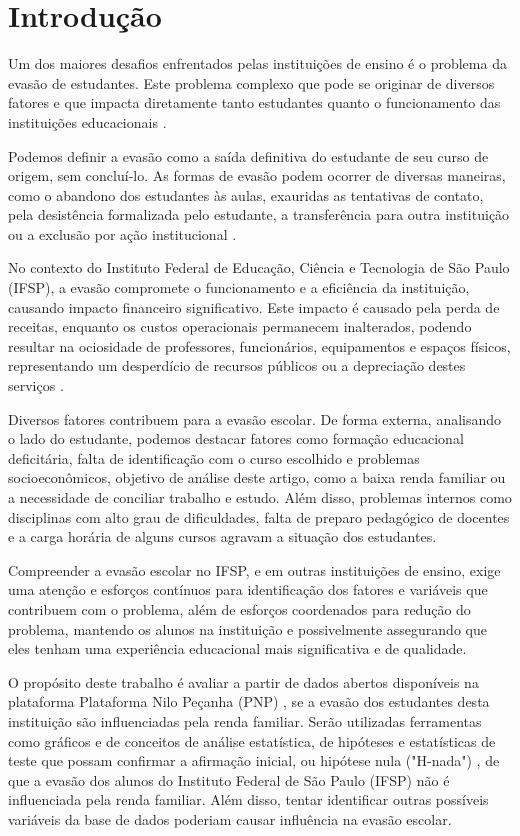 \documentclass[conference]{IEEEtran}
\begin{document}
\section{Introdução}
Um dos maiores desafios enfrentados pelas instituições de ensino é o problema da evasão de estudantes. Este problema complexo que pode se originar de diversos fatores e que impacta diretamente tanto estudantes quanto o funcionamento das instituições educacionais \cite{oliveira2021}.\par
Podemos definir a evasão como a saída definitiva do estudante de seu curso de origem, sem concluí-lo. As formas de evasão podem ocorrer de diversas maneiras, como o abandono dos estudantes às aulas, exauridas as tentativas de contato, pela desistência formalizada pelo estudante, a transferência para outra instituição ou a exclusão por ação institucional \cite{silveira2021}.\par
No contexto do Instituto Federal de Educação, Ciência e Tecnologia de São Paulo (IFSP), a evasão compromete o funcionamento e a eficiência da instituição, causando impacto financeiro significativo. Este impacto é causado pela perda de receitas, enquanto os custos operacionais permanecem inalterados, podendo resultar na ociosidade de professores, funcionários, equipamentos e espaços físicos, representando um desperdício de recursos públicos ou a depreciação destes serviços \cite{silveira2021}.\par
Diversos fatores contribuem para a evasão escolar. De forma externa, analisando o lado do estudante, podemos destacar fatores como formação educacional deficitária, falta de identificação com o curso escolhido e problemas socioeconômicos, objetivo de análise deste artigo, como a baixa renda familiar ou a necessidade de conciliar trabalho e estudo. Além disso, problemas internos como disciplinas com alto grau de dificuldades, falta de preparo pedagógico de docentes e a carga horária de alguns cursos agravam a situação dos estudantes.\par
Compreender a evasão escolar no IFSP, e em outras instituições de ensino, exige uma atenção e esforços contínuos para identificação dos fatores e variáveis que contribuem com o problema, além de esforços coordenados para redução do problema, mantendo os alunos na instituição e possivelmente assegurando que eles tenham uma experiência educacional mais significativa e de qualidade.\par
O propósito deste trabalho é avaliar a partir de dados abertos disponíveis na plataforma Plataforma Nilo Peçanha (PNP) \cite{pnp2024}, se a evasão dos estudantes desta instituição são influenciadas pela renda familiar. Serão utilizadas ferramentas como gráficos e de conceitos de análise estatística, de hipóteses e estatísticas de teste que possam confirmar a afirmação inicial, ou hipótese nula ("H-nada") \cite{ismay2024}, de que a evasão dos alunos do Instituto Federal de São Paulo (IFSP) não é influenciada pela renda familiar. Além disso, tentar identificar outras possíveis variáveis da base de dados poderiam causar influência na evasão escolar.
\end{document}
